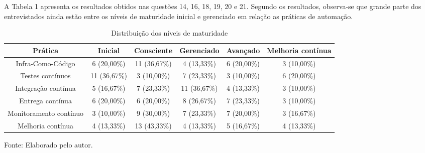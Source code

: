 \documentclass[twoside,english,brazilian]{UNISINOSartigo}
\newcommand{\source}[1]{\caption*{Fonte: {#1}} }
\begin{document}
A Tabela 1 apresenta os resultados obtidos nas questões 14, 16, 18, 19, 20 e 21. Segundo os resultados, observa-se que grande parte dos entrevistados ainda estão entre os níveis de maturidade inicial e gerenciado em relação as práticas de automação.
\begin{table}[H]
\footnotesize
\caption{Distribuição dos níveis de maturidade}
    \begin{tabularx}{\columnwidth}{cccccc}
    \hline
       Prática                  &    Inicial &    Consciente &    Gerenciado &    Avançado &    Melhoria contínua \\ \hline 
       Infra-Como-Código        &    6 (20,00\%)  &    11 (36,67\%)    &    4 (13,33\%)    &    6 (20,00\%)  &    3 (10,00\%)           \\
       Testes   contínuos       &    11 (36,67\%) &    3 (10,00\%)    &    7 (23,33\%)    &    3 (10,00\%)  &    6 (20,00\%)           \\
       Integração   contínua    &    5 (16,67\%)  &    7 (23,33\%)    &    11 (36,67\%)    &    4 (13,33\%)  &    3 (10,00\%)           \\
       Entrega   contínua       &    6 (20,00\%) &    6 (20,00\%)    &    8 (26,67\%)    &    7 (23,33\%)  &    3 (10,00\%)           \\ 
       Monitoramento   contínuo &    3 (10,00\%) &    9 (30,00\%)    &    7 (23,33\%)    &    7 (20,00\%)  &    3 (16,67\%)           \\
       Melhoria   contínua      &    4 (13,33\%) &    13 (43,33\%)    &    4 (13,33\%)    &    5 (16,67\%)  &    4 (13,33\%)           \\ \hline
    \end{tabularx}
    \source{Elaborado pelo autor.}
\end{table}
\end{document}
